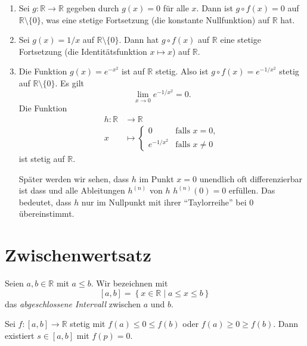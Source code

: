 \documentclass[../main.tex]{subfiles}
\begin{document}
\begin{examples}
  \leavevmode
  \begin{enumerate}[(1)]
    \item Sei $g \colon \mathbb{R} \to \mathbb{R}$ gegeben
      durch $g(x) = 0$ für alle $x$. Dann ist
      $g \circ f(x) = 0$ auf $\mathbb{R} \setminus \{0\}$,
      was eine stetige Fortsetzung (die konstante Nullfunktion)
      auf $\mathbb{R}$ hat.
    \item Sei $g(x) = 1/x$ auf $\mathbb{R} \setminus \{0\}$.
      Dann hat $g \circ f(x)$ auf $\mathbb{R}$ 
      eine stetige Fortsetzung (die Identitätsfunktion $x
      \mapsto x$) auf $\mathbb{R}$.
    \item Die Funktion $g(x) = e^{-x^2}$ ist auf $\mathbb{R}$ 
      stetig.
      Also ist $g \circ f(x) = e^{-1/x^2}$ stetig
      auf $\mathbb{R} \setminus \{0\}$.
      Es gilt
      \[
        \lim_{x \to 0}e^{-1/x^2} = 0.
      \]
      Die Funktion
      \begin{align*}
        h \colon \mathbb{R} & \to \mathbb{R} \\
        x & \mapsto 
        \begin{cases}
          0 & \text{falls } x = 0, \\
          e^{-1/x^2} & \text{falls } x \neq 0
        \end{cases}
      \end{align*}
      ist stetig auf $\mathbb{R}$.

      Später werden wir sehen,
      dass $h$ im Punkt $x = 0$ unendlich oft differenzierbar
      ist dass und alle Ableitungen $h^{(n)}$ von $h$
      $h^{(n)}(0) = 0$ erfüllen.
      Das bedeutet, dass $h$ nur im Nullpunkt
      mit ihrer ``Taylorreihe'' bei $0$
      übereinstimmt.
  \end{enumerate}
\end{examples}


\section{Zwischenwertsatz}

Seien $a, b \in \mathbb{R}$ mit $a \leq b$.
Wir bezeichnen mit
\[
  [a, b] = \left\{x \in \mathbb{R} \mid a \leq x \leq b\right\}
\]
das \emph{abgeschlossene Intervall} zwischen $a$ und $b$.

\begin{theorem}\label{thm:pre-zwischen}
  Sei $f \colon [a, b] \to \mathbb{R}$ stetig
  mit $f(a) \leq 0 \leq f(b)$ oder
  $f (a) \geq 0 \geq f(b)$. Dann existiert $s \in [a, b]$ 
  mit $f(p) = 0$.
\end{theorem}
\end{document}
